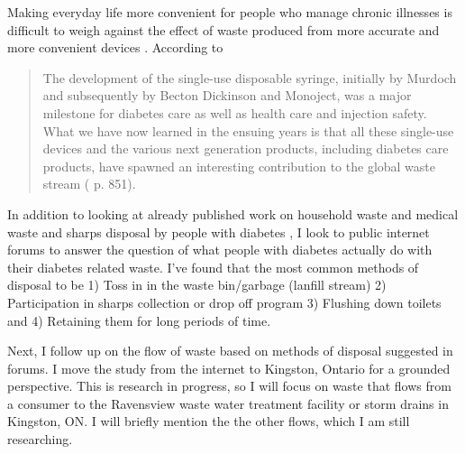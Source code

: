 \documentclass[12pt]{article}
\begin{document}
Making everyday life more convenient for people who manage chronic illnesses is difficult to weigh against the effect of waste produced from more accurate and more convenient devices \citep{gilg_green_2005}. According to \citet{krisiunas_waste_2011} \begin{quote}
The development of the single-use disposable syringe, initially by Murdoch and subsequently by Becton Dickinson and Monoject, was a major milestone for diabetes care as well as health care and injection safety. What we have now learned in the ensuing years is that all these single-use devices and the various next generation products, including diabetes care products, have spawned an interesting contribution to the global waste stream ( p. 851). \end{quote}

In addition to looking at already published work on household waste \citep{chappells_dustbin_1999} and medical waste and sharps disposal by people with diabetes \citep{bouhanick_what_2000,mcconville_syringe_2002}, I look to public internet forums to answer the question of what people with diabetes actually do with their diabetes related waste. I've found that the most common methods of disposal to be 1) Toss in in the waste bin/garbage (lanfill stream) 2) Participation in sharps collection or drop off program 3) Flushing down toilets and 4) Retaining them for long periods of time. 

Next, I follow up on the flow of waste based on methods of disposal suggested in forums. I move the study from the internet to Kingston, Ontario for a grounded perspective. This is research in progress, so I will focus on waste that flows from a consumer to the Ravensview waste water treatment facility or storm drains in Kingston, ON. I will briefly mention the the other flows, which I am still researching.
\end{document}
